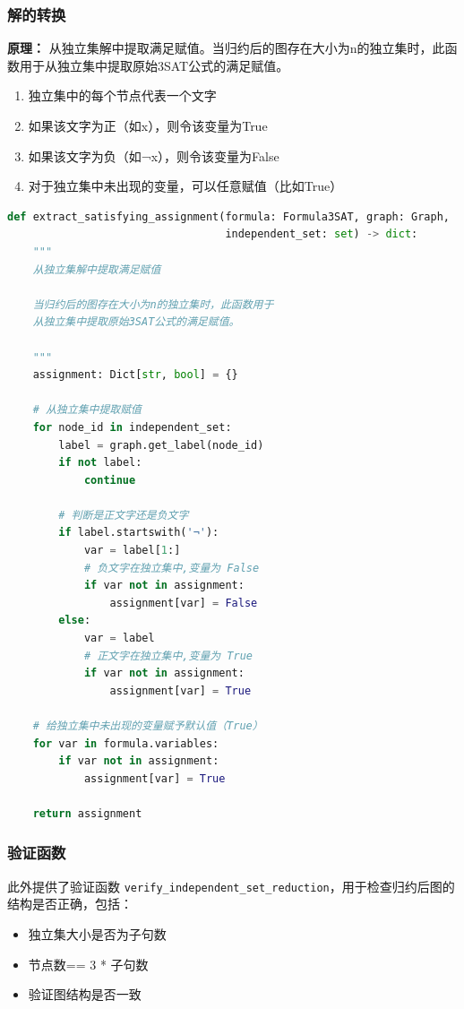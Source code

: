 \documentclass{sysucseexp}
\begin{document}
\subsubsection{解的转换}
\textbf{原理：}
从独立集解中提取满足赋值。当归约后的图存在大小为n的独立集时，此函数用于从独立集中提取原始3SAT公式的满足赋值。
\begin{enumerate}
    \item 独立集中的每个节点代表一个文字
    \item 如果该文字为正（如x），则令该变量为True
    \item 如果该文字为负（如¬x），则令该变量为False
    \item 对于独立集中未出现的变量，可以任意赋值（比如True）
\end{enumerate}

\begin{lstlisting}[language=Python]
def extract_satisfying_assignment(formula: Formula3SAT, graph: Graph, 
                                  independent_set: set) -> dict:
    """
    从独立集解中提取满足赋值
    
    当归约后的图存在大小为n的独立集时，此函数用于
    从独立集中提取原始3SAT公式的满足赋值。
    
    """
    assignment: Dict[str, bool] = {}
    
    # 从独立集中提取赋值
    for node_id in independent_set:
        label = graph.get_label(node_id)
        if not label:
            continue
        
        # 判断是正文字还是负文字
        if label.startswith('¬'):
            var = label[1:]
            # 负文字在独立集中,变量为 False
            if var not in assignment:
                assignment[var] = False
        else:
            var = label
            # 正文字在独立集中,变量为 True
            if var not in assignment:
                assignment[var] = True
    
    # 给独立集中未出现的变量赋予默认值（True）
    for var in formula.variables:
        if var not in assignment:
            assignment[var] = True
    
    return assignment
\end{lstlisting}

\subsubsection{验证函数}

此外提供了验证函数 \texttt{verify\_independent\_set\_reduction}，用于检查归约后图的结构是否正确，包括：
\begin{itemize}
    \item 独立集大小是否为子句数
    \item 节点数== 3 * 子句数
    \item 验证图结构是否一致
\end{itemize}
\end{document}
